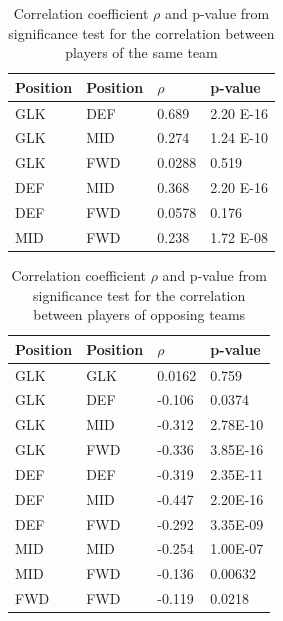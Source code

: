 \begin{table}[H]
\centering
\caption{Correlation coefficient $\rho$ and p-value from significance test for the correlation between players of the same team}
\label{tab:cor_team}
\begin{tabular}{|l|l|l|l|}
\hline
Position & Position & $\rho$    & p-value  \\
\hline
GLK      & DEF      & 0.689  & 2.20 E-16 \\
GLK      & MID      & 0.274  & 1.24 E-10 \\
GLK      & FWD      & 0.0288 & 0.519    \\
DEF      & MID      & 0.368  & 2.20 E-16 \\
DEF      & FWD      & 0.0578 & 0.176    \\
MID      & FWD      & 0.238  & 1.72 E-08 \\
\hline
\end{tabular}
\end{table}

\begin{table}[H]
\centering
\caption{Correlation coefficient $\rho$ and p-value from significance test for the correlation between players of opposing teams}
\label{tab:cor_opp}
\begin{tabular}{|l|l|l|l|}
\hline
Position & Position & $\rho$    & p-value  \\
\hline
GLK      & GLK      & 0.0162 & 0.759    \\
GLK      & DEF      & -0.106 & 0.0374   \\
GLK      & MID      & -0.312 & 2.78E-10 \\
GLK      & FWD      & -0.336 & 3.85E-16 \\
DEF      & DEF      & -0.319 & 2.35E-11 \\
DEF      & MID      & -0.447 & 2.20E-16 \\
DEF      & FWD      & -0.292 & 3.35E-09 \\
MID      & MID      & -0.254 & 1.00E-07 \\
MID      & FWD      & -0.136 & 0.00632 \\
FWD      & FWD      & -0.119 & 0.0218  \\
\hline
\end{tabular}
\end{table}